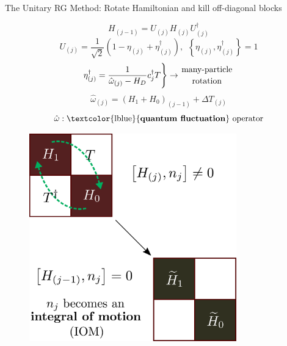 \documentclass[10pt,aspectratio=169]{beamer}
\newcommand{\focus}[1]{\textcolor{lblue}{\textbf{#1}}}
\begin{document}
\begin{frame}[noframenumbering]{The Unitary RG Method: Rotate Hamiltonian and kill off-diagonal blocks}

\vspace*{\fill}

\begin{minipage}{0.45\textwidth}
\centering
\[H_{(j-1)} = U_{(j)} H_{(j)} U_{(j)}^\dagger\]
\[U_{(j)} = \frac{1}{\sqrt 2}\left(1 - \eta_{(j)} + \eta_{(j)}^\dagger\right), ~ ~ \left\{\eta_{(j)}, \eta^\dagger_{(j)}\right\} = 1 \]
\[ \eta^\dagger_{(j)} = \frac{1}{\hat \omega_{(j)} - H_D}c^\dagger_j T \Bigg \} \rightarrow {\text{many-particle}\atop{\text{rotation}}}\]
\[\hat \omega_{(j)} = \left(H_{1} + H_{0}\right)_{(j-1)} + \Delta T_{(j)}\]
\[\hat \omega: \text{\focus{quantum fluctuation} operator}\]
\vspace*{\fill}
\end{minipage}
\hspace*{\fill}
\begin{minipage}{0.5\textwidth}
\begin{figure}
	\includegraphics[width=0.8\textwidth]{figures/urg_rot.pdf}
\end{figure}
\end{minipage}
\end{frame}
\end{document}
